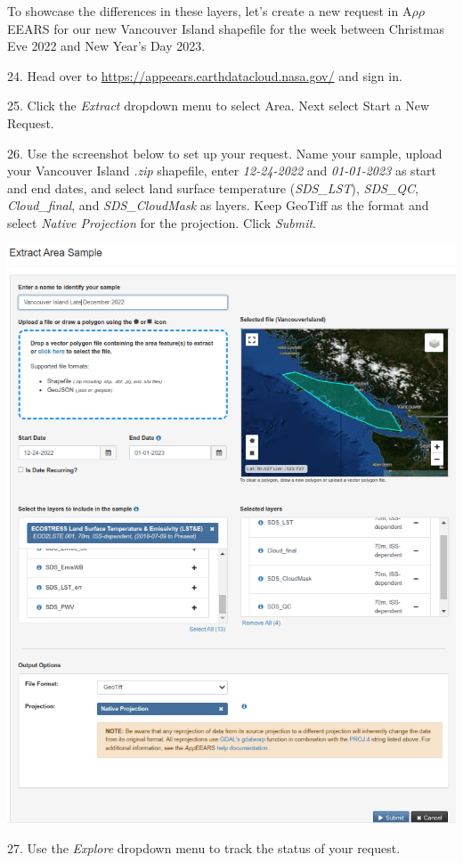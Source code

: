 \documentclass[oneside,a4paper,11pt,explicit]{book}
\begin{document}
	\vspace*{.75em}
	
	To showcase the differences in these layers, let's create a new request in A$\rho\rho$EEARS for our new Vancouver Island shapefile for the week between Christmas Eve 2022 and New Year's Day 2023.
	
	24. Head over to \href{https://appeears.earthdatacloud.nasa.gov/}{https://appeears.earthdatacloud.nasa.gov/} and sign in.
	
	25. Click the \textit{Extract} dropdown menu to select Area. Next select Start a New Request.
	
	26. Use the screenshot below to set up your request. Name your sample, upload your Vancouver Island \textit{.zip} shapefile, enter \textit{12-24-2022} and \textit{01-01-2023} as start and end dates, and select land surface temperature (\textit{SDS\_LST}), \textit{SDS\_QC}, \textit{Cloud\_final}, and \textit{SDS\_CloudMask} as layers. Keep GeoTiff as the format and select \textit{Native Projection} for the projection. Click \textit{Submit}.
	
	\centerline{\includegraphics[width=.75\textwidth]{ExtractVancouver.png}}
	
	27. Use the \textit{Explore} dropdown menu to track the status of your request. 
	
	\vspace{.25em}
	
\end{document}
